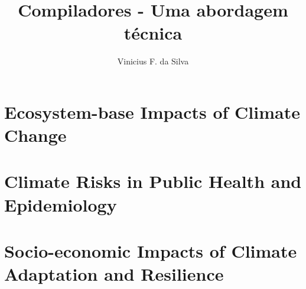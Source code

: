 \documentclass[krantz1,ChapterTOCs]{krantz}
\begin{document}
\frontmatter

\title{Compiladores - Uma abordagem técnica 
}
\author{Vinicius F. da Silva}

\maketitle

%
\setcounter{page}{7} %
\tableofcontents
%
%
\listoffigures
\listoftables
%
%

\mainmatter

\part{Ecosystem-base Impacts of Climate Change}

%

\part{Climate Risks in Public Health and Epidemiology}

\part{Socio-economic Impacts of Climate Adaptation and Resilience}






\printindex
\end{document}
